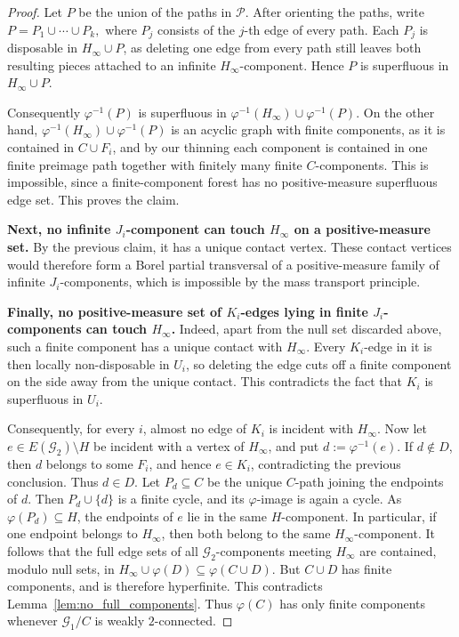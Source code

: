 \documentclass{article}
\theoremstyle{plain}
\theoremstyle{definition}
\newcommand{\cG}{\mathcal{G}}
\begin{document}
\begin{proof}
Let $P$ be the union of the paths in $\mathscr P$. After orienting the paths, write $P=P_1\cup\cdots\cup P_k,$
where $P_j$ consists of the $j$-th edge of every path. Each $P_j$ is disposable in $H_\infty\cup P$, as deleting one edge from every path still leaves both resulting pieces attached to an infinite $H_\infty$-component. Hence $P$ is superfluous in $H_\infty\cup P$.

Consequently $\varphi^{-1}(P)$ is superfluous in $\varphi^{-1}(H_\infty)\cup \varphi^{-1}(P)$. On the other hand, $\varphi^{-1}(H_\infty)\cup \varphi^{-1}(P)$ is an acyclic graph with finite components, as it is contained in $C\cup F_i$, and by our thinning each component is contained in one finite preimage path together with finitely many finite $C$-components. This is impossible, since a finite-component forest has no positive-measure superfluous edge set. This proves the claim.

{\bf Next, no infinite $J_i$-component can touch $H_\infty$ on a positive-measure set.} By the previous claim, it has a unique contact vertex. These contact vertices would therefore form a Borel partial transversal of a positive-measure family of infinite $J_i$-components, which is impossible by the mass transport principle.

{\bf Finally, no positive-measure set of $K_i$-edges lying in finite $J_i$-components can touch $H_\infty$.} Indeed, apart from the null set discarded above, such a finite component has a unique contact with $H_\infty$. Every $K_i$-edge in it is then locally non-disposable in $U_i$, so deleting the edge cuts off a finite component on the side away from the unique contact. This contradicts the fact that $K_i$ is superfluous in $U_i$.


Consequently, for every $i$, almost no edge of $K_i$ is incident with $H_\infty$. Now let $e\in E(\cG_2)\setminus H$ be incident with a vertex of $H_\infty$, and put $d:=\varphi^{-1}(e)$. If $d\notin D$, then $d$ belongs to some $F_i$, and hence $e\in K_i$, contradicting the previous conclusion. Thus $d\in D$. Let $P_d\subseteq C$ be the unique $C$-path joining the endpoints of $d$. Then $P_d\cup\{d\}$ is a finite cycle, and its $\varphi$-image is again a cycle. As $\varphi(P_d)\subseteq H$, the endpoints of $e$ lie in the same $H$-component. In particular, if one endpoint belongs to $H_\infty$, then both belong to the same $H_\infty$-component. It follows that the full edge sets of all $\cG_2$-components meeting $H_\infty$ are contained, modulo null sets, in $H_\infty\cup\varphi(D) \subseteq \varphi(C\cup D)$. But $C\cup D$ has finite components, and is therefore hyperfinite. This contradicts Lemma~\ref{lem:no_full_components}. Thus $\varphi(C)$ has only finite components whenever $\cG_1/C$ is weakly $2$-connected.


\end{proof}
\end{document}
